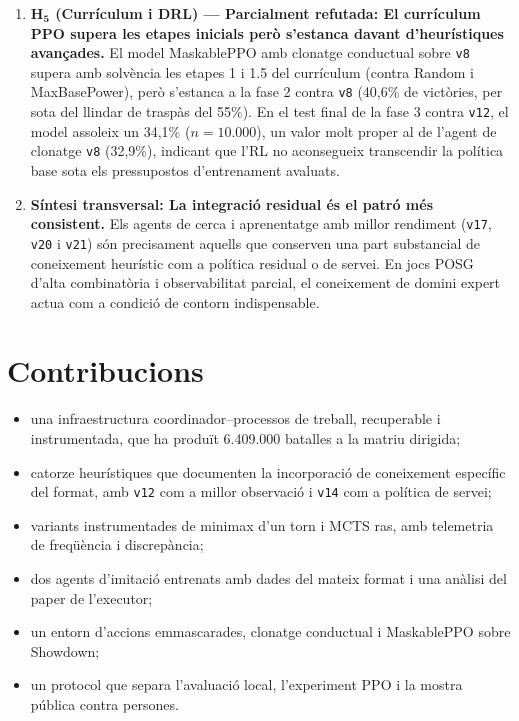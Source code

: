 \begin{enumerate}
    \item \textbf{$\mathbf{H_5}$ (Currículum i DRL) --- Parcialment refutada: El currículum PPO supera les etapes inicials però s'estanca davant d'heurístiques avançades.} El model MaskablePPO amb clonatge conductual sobre \texttt{v8} supera amb solvència les etapes 1 i 1.5 del currículum (contra Random i MaxBasePower), però s'estanca a la fase 2 contra \texttt{v8} (40,6\% de victòries, per sota del llindar de traspàs del 55\%). En el test final de la fase 3 contra \texttt{v12}, el model assoleix un 34,1\% ($n=10.000$), un valor molt proper al de l'agent de clonatge \texttt{v8} (32,9\%), indicant que l'RL no aconsegueix transcendir la política base sota els pressupostos d'entrenament avaluats.
    \item \textbf{Síntesi transversal: La integració residual és el patró més consistent.} Els agents de cerca i aprenentatge amb millor rendiment (\texttt{v17}, \texttt{v20} i \texttt{v21}) són precisament aquells que conserven una part substancial de coneixement heurístic com a política residual o de servei. En jocs POSG d'alta combinatòria i observabilitat parcial, el coneixement de domini expert actua com a condició de contorn indispensable.
\end{enumerate}

\section{Contribucions}

\begin{itemize}
    \item una infraestructura coordinador--processos de treball, recuperable i instrumentada, que ha produït 6.409.000 batalles a la matriu dirigida;
    \item catorze heurístiques que documenten la incorporació de coneixement específic del format, amb \texttt{v12} com a millor observació i \texttt{v14} com a política de servei;
    \item variants instrumentades de minimax d'un torn i MCTS ras, amb telemetria de freqüència i discrepància;
    \item dos agents d'imitació entrenats amb dades del mateix format i una anàlisi del paper de l'executor;
    \item un entorn d'accions emmascarades, clonatge conductual i MaskablePPO sobre Showdown;
    \item un protocol que separa l'avaluació local, l'experiment PPO i la mostra pública contra persones.
\end{itemize}

